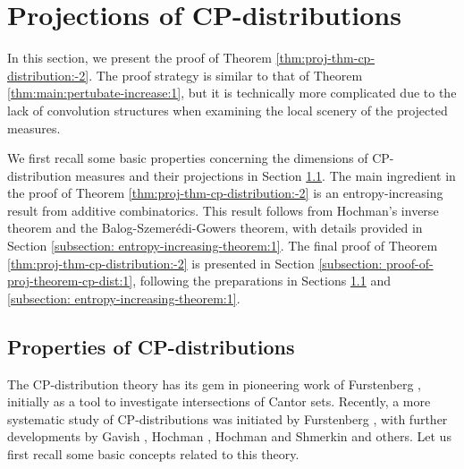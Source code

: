 \documentclass[a4paper,11pt]{amsart}
\theoremstyle{definition}
\numberwithin{equation}{section}
\begin{document}
\section{Projections of CP-distributions}\label{section: proj-CP-distributions:1}


In this section, we present the proof of Theorem \ref{thm:proj-thm-cp-distribution:-2}. The proof strategy is similar to that of Theorem \ref{thm:main:pertubate-increase:1}, but it is technically more complicated due to the lack of convolution structures when examining the local scenery of the projected measures.

We first recall some basic properties concerning the dimensions of CP-distribution measures and their projections in Section \ref{subsection: properties-of-CP-dist:1}. The main ingredient in the proof of Theorem \ref{thm:proj-thm-cp-distribution:-2} is an entropy-increasing result from additive combinatorics. This result follows from Hochman's inverse theorem and the Balog-Szemerédi-Gowers theorem, with details provided in Section \ref{subsection: entropy-increasing-theorem:1}.
The final proof of Theorem \ref{thm:proj-thm-cp-distribution:-2} is presented in Section \ref{subsection: proof-of-proj-theorem-cp-dist:1}, following the preparations in Sections \ref{subsection: properties-of-CP-dist:1} and \ref{subsection: entropy-increasing-theorem:1}.


\subsection{Properties  of CP-distributions}\label{subsection: properties-of-CP-dist:1}

The CP-distribution theory has its gem in pioneering work of Furstenberg \cite{Furstenberg69}, initially as a tool to investigate intersections of Cantor sets.  Recently, a more systematic study of CP-distributions was initiated by Furstenberg \cite{Furstenber2008}, with further developments by Gavish \cite{Gavish}, Hochman \cite{Hochman2010-fractal-distributions}, Hochman and Shmerkin \cite{HS2012} and others.  Let us first recall some basic concepts related to this theory.
\end{document}
